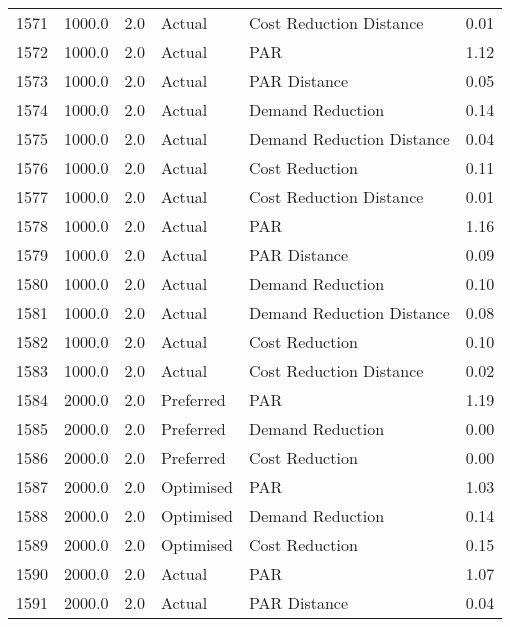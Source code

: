 \begin{longtable}{lrrllr}
1571 &       1000.0 &     2.0 &         Actual &    Cost Reduction Distance &   0.01 \\
1572 &       1000.0 &     2.0 &         Actual &                        PAR &   1.12 \\
1573 &       1000.0 &     2.0 &         Actual &               PAR Distance &   0.05 \\
1574 &       1000.0 &     2.0 &         Actual &           Demand Reduction &   0.14 \\
1575 &       1000.0 &     2.0 &         Actual &  Demand Reduction Distance &   0.04 \\
1576 &       1000.0 &     2.0 &         Actual &             Cost Reduction &   0.11 \\
1577 &       1000.0 &     2.0 &         Actual &    Cost Reduction Distance &   0.01 \\
1578 &       1000.0 &     2.0 &         Actual &                        PAR &   1.16 \\
1579 &       1000.0 &     2.0 &         Actual &               PAR Distance &   0.09 \\
1580 &       1000.0 &     2.0 &         Actual &           Demand Reduction &   0.10 \\
1581 &       1000.0 &     2.0 &         Actual &  Demand Reduction Distance &   0.08 \\
1582 &       1000.0 &     2.0 &         Actual &             Cost Reduction &   0.10 \\
1583 &       1000.0 &     2.0 &         Actual &    Cost Reduction Distance &   0.02 \\
1584 &       2000.0 &     2.0 &      Preferred &                        PAR &   1.19 \\
1585 &       2000.0 &     2.0 &      Preferred &           Demand Reduction &   0.00 \\
1586 &       2000.0 &     2.0 &      Preferred &             Cost Reduction &   0.00 \\
1587 &       2000.0 &     2.0 &      Optimised &                        PAR &   1.03 \\
1588 &       2000.0 &     2.0 &      Optimised &           Demand Reduction &   0.14 \\
1589 &       2000.0 &     2.0 &      Optimised &             Cost Reduction &   0.15 \\
1590 &       2000.0 &     2.0 &         Actual &                        PAR &   1.07 \\
1591 &       2000.0 &     2.0 &         Actual &               PAR Distance &   0.04 \\

\end{longtable}
